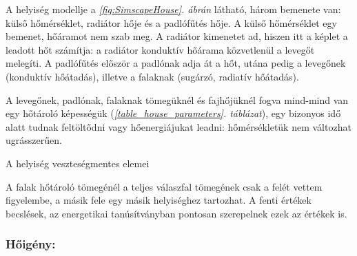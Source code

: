 A helyiség modellje a \textit{\ref{fig:SimscapeHouse}. ábrán} látható, három bemenete van: külső hőmérséklet, radiátor hője és a padlófűtés hője.
A külső hőmérséklet egy  bemenet, hőáramot nem szab meg.
A radiátor  kimenetet ad, hiszen itt a képlet a leadott hőt számítja: a radiátor konduktív hőárama közvetlenül a levegőt melegíti. A padlófűtés először a padlónak adja át a hőt, utána pedig a levegőnek (konduktív hőátadás), illetve a falaknak (sugárzó, radiatív hőátadás).

A levegőnek, padlónak, falaknak tömegüknél és fajhőjüknél fogva mind-mind van egy hőtároló képességük (\textit{\ref{table_house_parameters}. táblázat}), egy bizonyos idő alatt tudnak feltöltődni vagy hőenergiájukat leadni: hőmérsékletük nem változhat ugrásszerűen. %


\begin{table}[H]
	\footnotesize
	\centering
	\caption{A helyiség hőveszteséget okozó elemei}
	\renewcommand{\arraystretch}{1.3} %
	
%		
	\label{table_house_parameters}
\end{table}

\begin{table}[H]
	\footnotesize
	\centering
	\caption{A helyiség veszteségmentes elemei}
	\renewcommand{\arraystretch}{1.3} %
	
	\label{table_house_parametersB}
\end{table}

A falak hőtároló tömegénél a teljes válaszfal tömegének csak a felét vettem figyelembe, a másik fele egy másik helyiséghez tartozhat. A fenti értékek becslések, az energetikai tanúsítványban pontosan szerepelnek ezek az értékek is.


\subsubsection*{Hőigény:}

